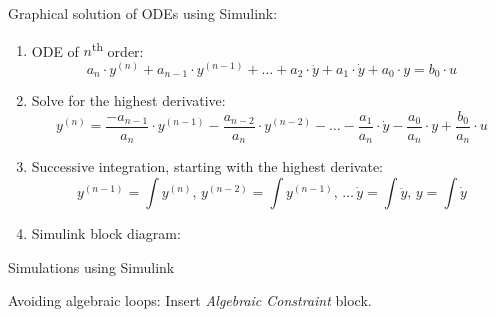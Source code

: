 \documentclass[a4paper,fontsize=11pt,parskip]{scrartcl}
\begin{document}
Graphical solution of ODEs using Simulink:
\begin{enumerate}
	\item ODE of $n$\textsuperscript{th} order: \[a_n\cdot y^{(n)}+a_{n-1}\cdot y^{(n-1)}+\dots+a_2\cdot\ddot y+a_1\cdot\dot y+a_0\cdot y=b_0\cdot u\]
	\item Solve for the highest derivative: \[y^{(n)}=\frac{-a_{n-1}}{a_n}\cdot y^{(n-1)}-\frac{a_{n-2}}{a_n}\cdot y^{(n-2)}-\dots-\frac{a_1}{a_n}\cdot\dot y-\frac{a_0}{a_n}\cdot y+\frac{b_0}{a_n}\cdot u\]
	\item Successive integration, starting with the highest derivate: \[y^{(n-1)}=\int y^{(n)},\,y^{(n-2)}=\int y^{(n-1)},\,\dots\,\dot y=\int\ddot y,\,y=\int\dot y\]
\item Simulink block diagram:
\end{enumerate}

{\Large Simulations using Simulink}

Avoiding algebraic loops: Insert \emph{Algebraic Constraint} block.
\end{document}
